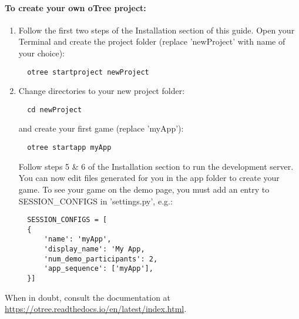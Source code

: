 \documentclass{article}
\begin{document}
			\paragraph{To create your own oTree project:} 
				\begin{enumerate}
					\item Follow the first two steps of the Installation section of this guide. Open your Terminal and create the project folder (replace 'newProject' with name of your choice):
					 \begin{lstlisting}
  otree startproject newProject
					 \end{lstlisting}
					 \item Change directories to your new project folder:
					 \begin{lstlisting}
  cd newProject
					 \end{lstlisting}
					 and create your first game (replace 'myApp'):
					 \begin{lstlisting}
  otree startapp myApp
					 \end{lstlisting}
					 Follow steps 5 \& 6 of the Installation section to run the development server. You can now edit files generated for you in the app folder to create your game. To see your game on the demo page, you must add an entry to SESSION\_CONFIGS in 'settings.py', e.g.:
					 \begin{lstlisting}
  SESSION_CONFIGS = [
  {
      'name': 'myApp',
      'display_name': 'My App,
      'num_demo_participants': 2,
      'app_sequence': ['myApp'],
  }]
					 \end{lstlisting}
					 \end{enumerate}
					 When in doubt, consult the documentation at \url{https://otree.readthedocs.io/en/latest/index.html}.
	  
\end{document}
